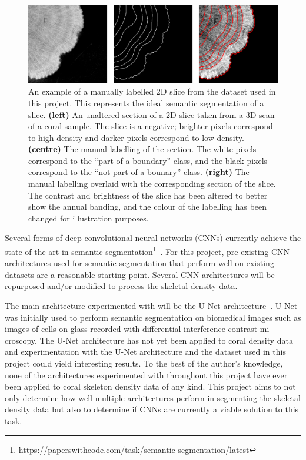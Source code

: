 \begin{figure}[t]
    \centering
    \includegraphics[width=1\textwidth]{images/label-example.png}
    \caption{An example of a manually labelled 2D slice from the dataset used in this project. This represents the ideal semantic segmentation of a slice. \textbf{(left)} An unaltered section of a 2D slice taken from a 3D scan of a coral sample. The slice is a negative; brighter pixels correspond to high density and darker pixels correspond to low density. \textbf{(centre)} The manual labelling of the section. The white pixels correspond to the ``part of a boundary'' class, and the black pixels correspond to the ``not part of a bounary'' class. \textbf{(right)} The manual labelling overlaid with the corresponding section of the slice. The contrast and brightness of the slice has been altered to better show the annual banding, and the colour of the labelling has been changed for illustration purposes.}
    \label{fig:example-label}
\end{figure}

Several forms of deep convolutional neural networks (CNNs) currently achieve the state-of-the-art in semantic segmentation\footnote{\url{https://paperswithcode.com/task/semantic-segmentation/latest}}~\cite{chen2018encoder, semanticseg-SOTA}. For this project, pre-existing CNN architectures used for semantic segmentation that perform well on existing datasets are a reasonable starting point. Several CNN architectures will be repurposed and/or modified to process the skeletal density data.

The main architecture experimented with will be the U-Net architecture~\cite{ronneberger2015u}. U-Net was initially used to perform semantic segmentation on biomedical images such as images of cells on glass recorded with differential interference contrast mi-croscopy. The U-Net architecture has not yet been applied to coral density data and experimentation with the U-Net architecture and the dataset used in this project could yield interesting results. To the best of the author's knowledge, none of the architectures experimented with throughout this project have ever been applied to coral skeleton density data of any kind. This project aims to not only determine how well multiple architectures perform in segmenting the skeletal density data but also to determine if CNNs are currently a viable solution to this task.

